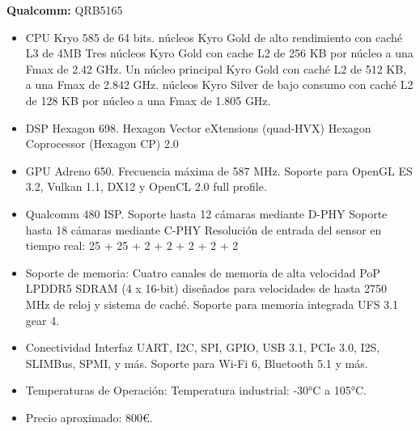 \documentclass[11pt]{report}
\begin{document}
\textbf{Qualcomm:} QRB5165
\begin{itemize}
      \item CPU Kryo 585 de 64 bits.
             núcleos Kyro Gold de alto rendimiento con caché L3 de 4MB
            \subsubitem Tres núcleos Kyro Gold con cache L2 de 256 KB por núcleo a una Fmax de 2.42 GHz.
            \subsubitem Un núcleo principal Kyro Gold con caché L2 de 512 KB, a una Fmax de 2.842 GHz.
             núcleos Kyro Silver de bajo consumo con caché L2 de 128 KB por núcleo a una Fmax de 1.805 GHz.
      \item DSP Hexagon 698.
            \subitem Hexagon Vector eXtensions (quad-HVX)
            \subitem Hexagon Coprocessor (Hexagon CP) 2.0

      \item GPU Adreno 650.
            \subitem Frecuencia máxima de 587 MHz.
            \subitem Soporte para OpenGL ES 3.2, Vulkan 1.1, DX12 y OpenCL 2.0 full profile.

      \item Qualcomm 480 ISP.
            \subitem Soporte hasta 12 cámaras mediante D-PHY
            \subitem Soporte hasta 18 cámaras mediante C-PHY
            \subitem Resolución de entrada del sensor en tiempo real: 25 + 25 + 2 + 2 + 2 + 2 + 2

      \item Soporte de memoria:
            \subitem Cuatro canales de memoria de alta velocidad PoP LPDDR5 SDRAM (4 x 16-bit) diseñados para velocidades de hasta 2750 MHz de reloj y sistema de caché.
            \subitem Soporte para memoria integrada UFS 3.1 gear 4.

      \item Conectividad
            \subitem Interfaz UART, I2C, SPI, GPIO, USB 3.1, PCIe 3.0, I2S, SLIMBus, SPMI, y más.
            \subitem Soporte para Wi-Fi 6, Bluetooth 5.1 y más.

      \item Temperaturas de Operación:
            \subitem Temperatura industrial: -30°C a 105°C.

      \item Precio aproximado: 800\euro.
\end{itemize}
\end{document}
